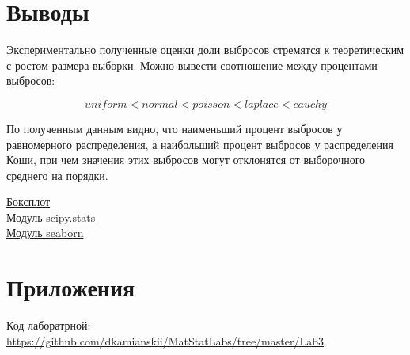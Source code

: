 \documentclass[a4]{article}
\begin{document}
\section{Выводы}
\par Экспериментально полученные оценки доли выбросов стремятся к теоретическим с ростом размера выборки.
Можно вывести соотношение между процентами выбросов:

\begin{equation}
uniform<normal<poisson<laplace<cauchy
\end{equation}

\par По полученным данным видно, что наименьший процент выбросов у равномерного распределения, а наибольший процент выбросов у распределения Коши, при чем значения этих выбросов могут отклонятся от выборочного среднего на порядки.

\begin{thebibliography}{}    
    \href{https://en.wikipedia.org/wiki/Box\_plot}{Боксплот}\\
    \href{https://docs.scipy.org/doc/scipy/reference/stats.html}{Модуль scipy.stats}\\
    \href{https://seaborn.pydata.org/}{Модуль seaborn}
\end{thebibliography}

\section{Приложения}


Код лаборатрной:\; \url{https://github.com/dkamianskii/MatStatLabs/tree/master/Lab3}
\end{document}

